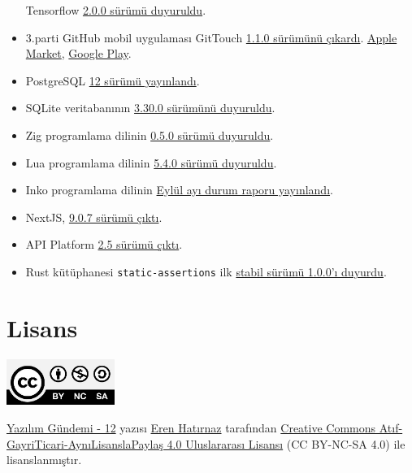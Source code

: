 \documentclass[11pt]{article}
\begin{document}
\begin{itemize}
Tensorflow \href{https://github.com/tensorflow/tensorflow/releases/tag/v2.0.0}{2.0.0 sürümü duyuruldu}.
\item 3.parti GitHub mobil uygulaması GitTouch \href{https://github.com/pd4d10/git-touch/releases/tag/v1.1.0}{1.1.0 sürümünü çıkardı}. \href{https://itunes.apple.com/us/app/gittouch/id1452042346}{Apple
Market}, \href{https://play.google.com/store/apps/details?id=io.github.pd4d10.gittouch}{Google Play}.
\item PostgreSQL \href{https://www.postgresql.org/about/news/1976/}{12 sürümü yayınlandı}.
\item SQLite veritabanının \href{https://www.sqlite.org/changes.html}{3.30.0 sürümünü duyuruldu}.
\item Zig programlama dilinin \href{https://ziglang.org/download/0.5.0/release-notes.html}{0.5.0 sürümü duyuruldu}.
\item Lua programlama dilinin \href{http://lua-users.org/lists/lua-l/2019-10/msg00003.html}{5.4.0 sürümü duyuruldu}.
\item Inko programlama dilinin \href{https://inko-lang.org/news/inko-progress-report-september-2019/}{Eylül ayı durum raporu yayınlandı}.
\item NextJS, \href{https://nextjs.org/blog/next-9-0-7}{9.0.7 sürümü çıktı}.
\item API Platform \href{https://dunglas.fr/2019/09/api-platform-2-5-revamped-admin-new-api-testing-tool-next-js-and-quasar-app-generators-patch-and-json-schema-support-improved-openapi-and-graphql-support}{2.5 sürümü çıktı}.
\item Rust kütüphanesi \texttt{static-assertions} ilk \href{https://nikolaivazquez.com/posts/programming/rust-static-assertions-1\_0/}{stabil sürümü 1.0.0'ı duyurdu}.
\end{itemize}
\section{Lisans}
\label{sec:orgc14ca4a}
\begin{center}
\begin{center}
\includegraphics[height=1.5cm]{../../../img/CC_BY-NC-SA_4.0.png}
\end{center}

\href{yazilim-gundemi-12.pdf}{Yazılım Gündemi - 12} yazısı \href{https://erenhatirnaz.github.io}{Eren Hatırnaz} tarafından \href{http://creativecommons.org/licenses/by-nc-sa/4.0/}{Creative Commons
Atıf-GayriTicari-AynıLisanslaPaylaş 4.0 Uluslararası Lisansı} (CC BY-NC-SA 4.0)
ile lisanslanmıştır.
\end{center}
\end{document}
